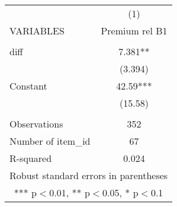\documentclass[]{article}
\begin{document}
\begin{tabular}{lc} \hline
 & (1) \\
VARIABLES & Premium rel B1 \\ \hline
 &  \\
diff & 7.381** \\
 & (3.394) \\
Constant & 42.59*** \\
 & (15.58) \\
 &  \\
Observations & 352 \\
Number of item\_id & 67 \\
 R-squared & 0.024 \\ \hline
\multicolumn{2}{c}{ Robust standard errors in parentheses} \\
\multicolumn{2}{c}{ *** p$<$0.01, ** p$<$0.05, * p$<$0.1} \\
\end{tabular}
\end{document}

